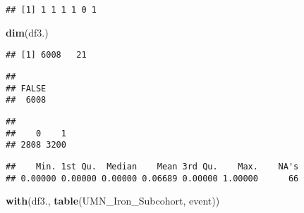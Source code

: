 \documentclass[
]{article}
\newenvironment{Shaded}{\begin{snugshade}}{\end{snugshade}}
\newcommand{\CommentTok}[1]{\textcolor[rgb]{0.56,0.35,0.01}{\textit{#1}}}
\newcommand{\KeywordTok}[1]{\textcolor[rgb]{0.13,0.29,0.53}{\textbf{#1}}}
\newcommand{\NormalTok}[1]{#1}
\newcommand{\OperatorTok}[1]{\textcolor[rgb]{0.81,0.36,0.00}{\textbf{#1}}}
\begin{document}
\begin{verbatim}
## [1] 1 1 1 1 0 1
\end{verbatim}

\begin{Shaded}
\begin{Highlighting}[]
\KeywordTok{dim}\NormalTok{(df3.)}
\end{Highlighting}
\end{Shaded}

\begin{verbatim}
## [1] 6008   21
\end{verbatim}

\begin{Shaded}
\end{Shaded}

\begin{verbatim}
## 
## FALSE 
##  6008
\end{verbatim}

\begin{Shaded}
\end{Shaded}

\begin{verbatim}
## 
##    0    1 
## 2808 3200
\end{verbatim}

\begin{Shaded}
\end{Shaded}

\begin{verbatim}
##    Min. 1st Qu.  Median    Mean 3rd Qu.    Max.    NA's 
## 0.00000 0.00000 0.00000 0.06689 0.00000 1.00000      66
\end{verbatim}

\begin{Shaded}
\begin{Highlighting}[]
\KeywordTok{with}\NormalTok{(df3., }\KeywordTok{table}\NormalTok{(UMN_Iron_Subcohort, event))}
\end{Highlighting}
\end{Shaded}
\end{document}
